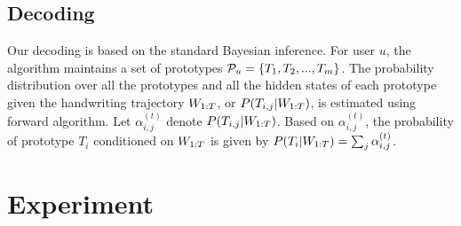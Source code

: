 \documentclass{sigchi}
\begin{document}
\subsection{Decoding}

\newcommand{\forwardprob}{\alpha^{(t)}_{i,j}}

Our decoding is based on the standard Bayesian inference.
For user $u$, the algorithm maintains a set of prototypes
$\mathcal{P}_u = \{ T_1, T_2, ... , T_m\}$. The probability distribution over all
the prototypes and all the hidden states of each prototype given the
handwriting trajectory $W_{1:{T}}$, or $P(T_{i,j} |W_{1:{T}})$, is
estimated using forward algorithm. Let $\forwardprob$ denote $P(T_{i,j} |
W_{1:{T}})$. Based on $\forwardprob$, the probability of prototype
$T_i$ conditioned on $W_{1:{T}}$ is given by $P(T_i | \writing{T}) = \sum_{j}
\forwardprob$. 


\section{Experiment}
\label{sec:experiment}

\end{document}
